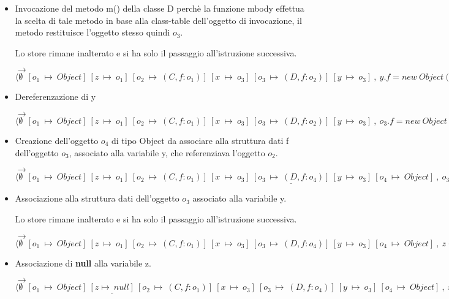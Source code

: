 \begin{itemize}
\vspace{0,5cm}
\item Invocazione del metodo m() della classe D perch\`e la funzione mbody effettua la scelta di tale metodo in base alla class-table dell'oggetto di invocazione, il metodo restituisce l'oggetto stesso quindi $o_3$.

Lo store rimane inalterato e si ha solo il passaggio all'istruzione successiva.

$\rightarrow$ $\langle\emptyset\:\:[o_1\:\mapsto\:Object]\:[z\:\mapsto\:o_1]\:[o_2\:\mapsto\:(C,f:o_1)]\:[x\:\mapsto\:o_3]\:[o_3\:\mapsto\:(D,f:o_2)]\:[y\:\mapsto\:o_3]\:,\:y.f=new\:Object();.....\rangle$

\vspace{0,5cm}
\item Dereferenzazione di y

$\rightarrow$ $\langle\emptyset\:\:[o_1\:\mapsto\:Object]\:[z\:\mapsto\:o_1]\:[o_2\:\mapsto\:(C,f:o_1)]\:[x\:\mapsto\:o_3]\:[o_3\:\mapsto\:(D,f:o_2)]\:[y\:\mapsto\:o_3]\:,\:o_3.f=new\:Object();.....\rangle$

\vspace{0,5cm}
\item Creazione dell'oggetto $o_4$ di tipo Object da associare alla struttura dati f dell'oggetto $o_3$, associato alla variabile y, che referenziava l'oggetto $o_2$.

$\rightarrow$ $\langle\emptyset\:\:[o_1\:\mapsto\:Object]\:[z\:\mapsto\:o_1]\:[o_2\:\mapsto\:(C,f:o_1)]\:[x\:\mapsto\:o_3]\:\underline{[o_3\:\mapsto\:(D,f:o_4)]}\:[y\:\mapsto\:o_3]\:[o_4\:\mapsto\:Object]\:,\:o_3.f=o_4;.....\rangle$

\vspace{0,5cm}
\item Associazione alla struttura dati dell'oggetto $o_3$ associato alla variabile y.

Lo store rimane inalterato e si ha solo il passaggio all'istruzione successiva.

$\rightarrow$ $\langle\emptyset\:\:[o_1\:\mapsto\:Object]\:[z\:\mapsto\:o_1]\:[o_2\:\mapsto\:(C,f:o_1)]\:[x\:\mapsto\:o_3]\:[o_3\:\mapsto\:(D,f:o_4)]\:[y\:\mapsto\:o_3]\:[o_4\:\mapsto\:Object]\:,\:z=null;.....\rangle$

\vspace{0,5cm}
\item Associazione di \textbf{null} alla variabile z. 

$\rightarrow$ $\langle\emptyset\:\:[o_1\:\mapsto\:Object]\:\underline{[z\mapsto\:null]}\:[o_2\:\mapsto\:(C,f:o_1)]\:[x\:\mapsto\:o_3]\:[o_3\:\mapsto\:(D,f:o_4)]\:[y\:\mapsto\:o_3]\:[o_4\:\mapsto\:Object]\:,\:x.f=z;.....\rangle$


\end{itemize}
